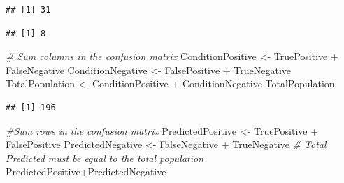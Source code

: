 \documentclass[
]{book}
\newenvironment{Shaded}{\begin{snugshade}}{\end{snugshade}}
\newcommand{\CommentTok}[1]{\textcolor[rgb]{0.56,0.35,0.01}{\textit{#1}}}
\newcommand{\DecValTok}[1]{\textcolor[rgb]{0.00,0.00,0.81}{#1}}
\newcommand{\NormalTok}[1]{#1}
\newcommand{\OtherTok}[1]{\textcolor[rgb]{0.56,0.35,0.01}{#1}}
\newcommand{\SpecialCharTok}[1]{\textcolor[rgb]{0.00,0.00,0.00}{#1}}
\begin{document}
\begin{Shaded}
\end{Shaded}

\begin{verbatim}
## [1] 31
\end{verbatim}

\begin{Shaded}
\end{Shaded}

\begin{verbatim}
## [1] 8
\end{verbatim}

\begin{Shaded}
\begin{Highlighting}[]
\CommentTok{\# Sum columns in the confusion matrix}
\NormalTok{ConditionPositive }\OtherTok{\textless{}{-}}\NormalTok{ TruePositive }\SpecialCharTok{+}\NormalTok{ FalseNegative}
\NormalTok{ConditionNegative }\OtherTok{\textless{}{-}}\NormalTok{ FalsePositive }\SpecialCharTok{+}\NormalTok{ TrueNegative}
\NormalTok{TotalPopulation }\OtherTok{\textless{}{-}}\NormalTok{ ConditionPositive }\SpecialCharTok{+}\NormalTok{ ConditionNegative}
\NormalTok{TotalPopulation}
\end{Highlighting}
\end{Shaded}

\begin{verbatim}
## [1] 196
\end{verbatim}

\begin{Shaded}
\begin{Highlighting}[]
\CommentTok{\#Sum rows in the confusion matrix}
\NormalTok{PredictedPositive }\OtherTok{\textless{}{-}}\NormalTok{ TruePositive }\SpecialCharTok{+}\NormalTok{ FalsePositive}
\NormalTok{PredictedNegative }\OtherTok{\textless{}{-}}\NormalTok{ FalseNegative }\SpecialCharTok{+}\NormalTok{ TrueNegative}
\CommentTok{\# Total Predicted must be equal to the total population}
\NormalTok{PredictedPositive}\SpecialCharTok{+}\NormalTok{PredictedNegative}
\end{Highlighting}
\end{Shaded}
\end{document}
